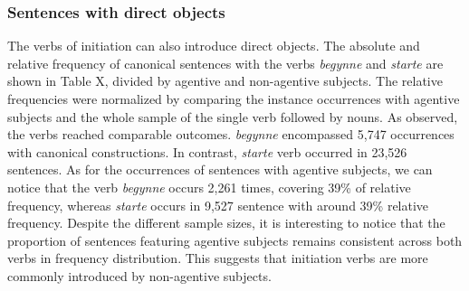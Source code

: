\documentclass{article}
\begin{document}
\subsubsection{Sentences with direct objects} %
The verbs of initiation can also introduce direct objects. The absolute and relative frequency of canonical sentences with the verbs \emph{begynne} and \emph{starte} are shown in Table X, divided by agentive and non-agentive subjects. The relative frequencies were normalized by comparing the instance occurrences with agentive subjects and the whole sample of the single verb followed by nouns.
As observed, the verbs reached comparable outcomes. \emph{begynne} encompassed 5,747 occurrences with canonical constructions. In contrast, \emph{starte} verb occurred in 23,526 sentences.
As for the occurrences of sentences with agentive subjects, we can notice that the verb \emph{begynne} occurs 2,261 times, covering 39\% of relative frequency, whereas \emph{starte} occurs in 9,527 sentence with around 39\% relative frequency. 
Despite the different sample sizes, it is interesting to notice that the proportion of sentences featuring agentive subjects remains consistent across both verbs in frequency distribution. This suggests that initiation verbs are more commonly introduced by non-agentive subjects.
\end{document}
